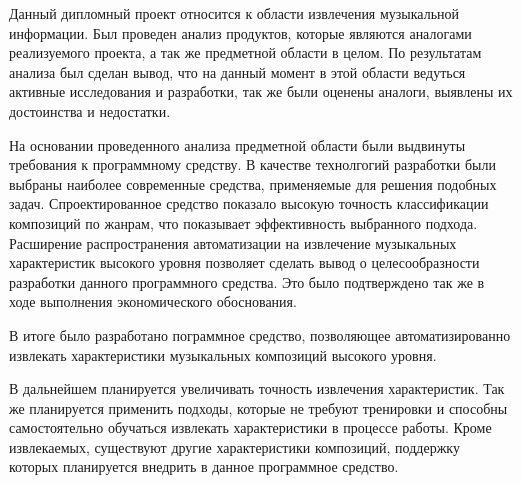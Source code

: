 
Данный дипломный проект относится к области извлечения музыкальной информации. Был проведен анализ продуктов, которые являются аналогами реализуемого проекта, а так же предметной области в целом. По результатам анализа был сделан вывод, что на данный момент в этой области ведуться активные исследования и разработки, так же были оценены аналоги, выявлены их достоинства и недостатки.

На основании проведенного анализа предметной области были выдвинуты требования к программному средству. В качестве технолгогий разработки были выбраны наиболее современные средства, применяемые для решения подобных задач. Спроектированное средство показало высокую точность классификации композиций по жанрам, что показывает эффективность выбранного подхода. Расширение распространения автоматизации на извлечение музыкальных характеристик высокого уровня позволяет сделать вывод о целесообразности разработки данного программного средства. Это было подтверждено так же в ходе выполнения экономического обоснования.

В итоге было разработано пограммное средство, позволяющее автоматизированно извлекать характеристики музыкальных композиций высокого уровня.

В дальнейшем планируется увеличивать точность извлечения характеристик. Так же планируется применить подходы, которые не требуют тренировки и способны самостоятельно обучаться извлекать характеристики в процессе работы. Кроме извлекаемых, существуют другие характеристики композиций, поддержку которых планируется внедрить в данное программное средство.
